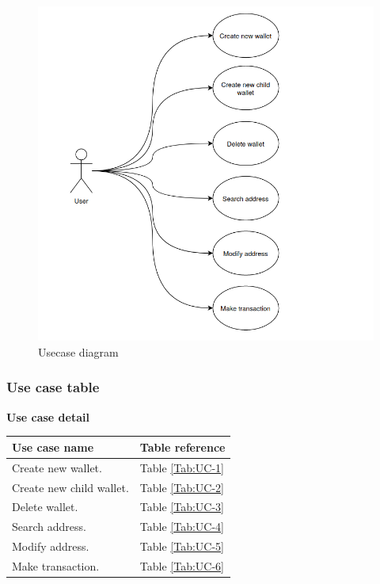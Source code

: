 \begin{figure}[ht!]
    \centering
    \includegraphics[width=1\textwidth]{images/usecases.png}
    \caption[Usecase diagram]{Usecase diagram}
    \label{fig:usecases}
\end{figure}

\newpage
\subsubsection{Use case table}

\bigskip
{\textbf{Use case detail}}

\begin{table}[b]
    \begin{tabular}{| m{8cm} | m{6cm} |}
        \hline
        Use case name            & Table reference      \\ \hline
        Create new wallet.       & Table \ref{Tab:UC-1} \\ \hline
        Create new child wallet. & Table \ref{Tab:UC-2} \\ \hline
        Delete wallet.           & Table \ref{Tab:UC-3} \\ \hline
        Search address.          & Table \ref{Tab:UC-4} \\ \hline
        Modify address.          & Table \ref{Tab:UC-5} \\ \hline
        Make transaction.        & Table \ref{Tab:UC-6} \\ \hline
    \end{tabular}
\end{table}

